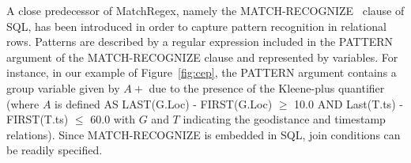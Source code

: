 A close predecessor of MatchRegex, namely the MATCH-RECOGNIZE~\cite{zemke_et_al_2007} clause of SQL, has been introduced in order to capture pattern recognition in relational rows. Patterns are described by a regular
expression included in the PATTERN argument of the MATCH-RECOGNIZE clause and represented by variables. For instance, in our example of Figure~\ref{fig:cep}, the PATTERN argument contains a group variable given by $A+$ due to the presence of the Kleene-plus quantifier (where $A$ is defined AS
LAST(G.Loc) - FIRST(G.Loc) $\geq$ 10.0
        AND Last(T.ts) - FIRST(T.ts) $\leq$ 60.0 with $G$ and $T$ indicating the geodistance and timestamp relations).      
Since MATCH-RECOGNIZE is embedded in SQL, join conditions can be readily specified.

